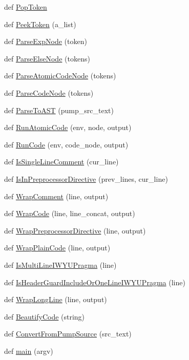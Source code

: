 \begin{DoxyCompactItemize}
def \hyperlink{namespacepump_a40f31f2cc2901242a70790e6076852c2}{Pop\+Token}
\item 
def \hyperlink{namespacepump_ab12085e099ab4bd0cd968efdc435ec31}{Peek\+Token} (a\+\_\+list)
\item 
def \hyperlink{namespacepump_af62b08489d90e69d0577e82c98383ba7}{Parse\+Exp\+Node} (token)
\item 
def \hyperlink{namespacepump_ae40493525a993e81929c6905e329a406}{Parse\+Else\+Node} (tokens)
\item 
def \hyperlink{namespacepump_a5532710f334f026f80fc485decf5078e}{Parse\+Atomic\+Code\+Node} (tokens)
\item 
def \hyperlink{namespacepump_aabbc064b8664abbe05618b3a0f5a6c38}{Parse\+Code\+Node} (tokens)
\item 
def \hyperlink{namespacepump_a56ac10a83a3a875d305c9aae71fc0549}{Parse\+To\+A\+S\+T} (pump\+\_\+src\+\_\+text)
\item 
def \hyperlink{namespacepump_a901e6abd34691a0d779178a615cc09c1}{Run\+Atomic\+Code} (env, node, output)
\item 
def \hyperlink{namespacepump_ac6a714a44e28c2a19a1dfabeb9c9d4f1}{Run\+Code} (env, code\+\_\+node, output)
\item 
def \hyperlink{namespacepump_a417078b1d036b67756c47e5dc50324dc}{Is\+Single\+Line\+Comment} (cur\+\_\+line)
\item 
def \hyperlink{namespacepump_aa33101b01d5781710262f3b5dadd8bc8}{Is\+In\+Preprocessor\+Directive} (prev\+\_\+lines, cur\+\_\+line)
\item 
def \hyperlink{namespacepump_a73951c98652038351b1cd24291433e12}{Wrap\+Comment} (line, output)
\item 
def \hyperlink{namespacepump_a42502545a37fcd4513a0a7ac8ef3c0eb}{Wrap\+Code} (line, line\+\_\+concat, output)
\item 
def \hyperlink{namespacepump_a59e8ae06bae068d2d72df4f0340635d8}{Wrap\+Preprocessor\+Directive} (line, output)
\item 
def \hyperlink{namespacepump_a60723738cc38d8ced7e2cfecc72d8b11}{Wrap\+Plain\+Code} (line, output)
\item 
def \hyperlink{namespacepump_a707a3ff4514c89607e48a87589aed787}{Is\+Multi\+Line\+I\+W\+Y\+U\+Pragma} (line)
\item 
def \hyperlink{namespacepump_ac8a553b60dc83d100361a0e98d98451b}{Is\+Header\+Guard\+Include\+Or\+One\+Line\+I\+W\+Y\+U\+Pragma} (line)
\item 
def \hyperlink{namespacepump_a02427e2ddc80f0f408e27dfc3e38e702}{Wrap\+Long\+Line} (line, output)
\item 
def \hyperlink{namespacepump_a3456db8d85605892d670669c4e238cd7}{Beautify\+Code} (string)
\item 
def \hyperlink{namespacepump_a568fe53d1443489ac15bac4a0f9faf91}{Convert\+From\+Pump\+Source} (src\+\_\+text)
\item 
def \hyperlink{namespacepump_abcf26971f7bdbad77c2c168c110312df}{main} (argv)
\end{DoxyCompactItemize}
